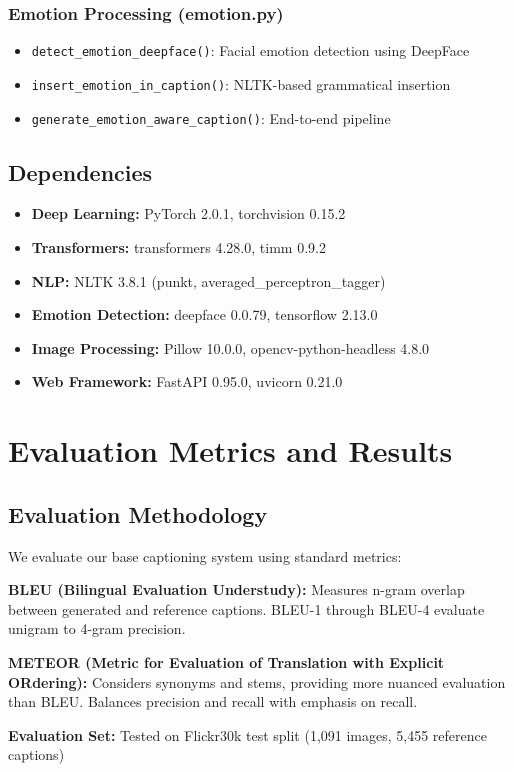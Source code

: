 \documentclass[12pt]{article}
\begin{document}
\subsubsection{Emotion Processing (emotion.py)}
\begin{itemize}
\item \texttt{detect\_emotion\_deepface()}: Facial emotion detection using DeepFace
\item \texttt{insert\_emotion\_in\_caption()}: NLTK-based grammatical insertion
\item \texttt{generate\_emotion\_aware\_caption()}: End-to-end pipeline
\end{itemize}

\subsection{Dependencies}
\begin{itemize}
\item \textbf{Deep Learning:} PyTorch 2.0.1, torchvision 0.15.2
\item \textbf{Transformers:} transformers 4.28.0, timm 0.9.2
\item \textbf{NLP:} NLTK 3.8.1 (punkt, averaged\_perceptron\_tagger)
\item \textbf{Emotion Detection:} deepface 0.0.79, tensorflow 2.13.0
\item \textbf{Image Processing:} Pillow 10.0.0, opencv-python-headless 4.8.0
\item \textbf{Web Framework:} FastAPI 0.95.0, uvicorn 0.21.0
\end{itemize}

\section{Evaluation Metrics and Results}

\subsection{Evaluation Methodology}

We evaluate our base captioning system using standard metrics:

\begin{metricbox}
\textbf{BLEU (Bilingual Evaluation Understudy):}
Measures n-gram overlap between generated and reference captions. BLEU-1 through BLEU-4 evaluate unigram to 4-gram precision.

\textbf{METEOR (Metric for Evaluation of Translation with Explicit ORdering):}
Considers synonyms and stems, providing more nuanced evaluation than BLEU. Balances precision and recall with emphasis on recall.

\textbf{Evaluation Set:}
Tested on Flickr30k test split (1,091 images, 5,455 reference captions)
\end{metricbox}
\end{document}
